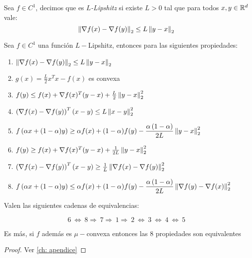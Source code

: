 \begin{definition}
	\label{def: L Lipshitz}
	Sea $f \in C^1$, decimos que es $L$\textit{-Lipshitz} si existe $L > 0$ tal que para todos $x,y \in {\mathbb{R}}^d$ vale:
	\begin{equation}
	\left\lVert\nabla f(x) - \nabla f (y)\right\rVert_2 \leq  L\left\lVert y-x\right\rVert_2
	\end{equation}
\end{definition}

\begin{proposition}
	\label{prop: Implicancias L lipshitz}
	Sea $f \in C^1$ una funci\'on $L-$Lipshitz, entonces para las siguientes propiedades:
	\begin{enumerate}
		\item $\left\lVert\nabla f(x) - \nabla f (y)\right\rVert_2 \leq  L\left\lVert y-x\right\rVert_2$
		\item $g(x) = \frac{L}{2} x^Tx - f(x)$ es convexa
		\item $f(y) \leq f(x) + \nabla f(x)^T (y-x) + \frac{L}{2}\left\lVert y-x\right\rVert_2^2$
		\item $\left(\nabla f(x) - \nabla f(y)\right)^T (x-y) \leq L\left\lVert x-y\right\rVert^2_2$
		\item $f\left(\alpha x + (1-\alpha)y\right) \geq \alpha f(x) + (1-\alpha) f(y) - \dfrac{\alpha \left(1 - \alpha \right)}{2L}\left\lVert y-x\right\rVert_2^2$
		\item $f(y) \geq f(x) + \nabla f(x)^T (y-x) +\frac{1}{2L} \left\lVert y-x\right\rVert^2_2$
		\item $\left(\nabla f(x) - \nabla f(y)\right)^T (x-y) \geq \frac{1}{L}\left\lVert\nabla f(x)- \nabla f(y)\right\rVert^2_2$
		\item $f\left(\alpha x + (1-\alpha)y\right) \leq \alpha f(x) + (1-\alpha) f(y) - \dfrac{\alpha \left(1 - \alpha \right)}{2L}\left\lVert\nabla f(y)- \nabla f (x)\right\rVert_2^2$
	\end{enumerate}

	Valen las siguientes cadenas de equivalencias:
	
	\begin{equation*}
		6 \ \Longleftrightarrow \ 8 \Longrightarrow \ 7 \Longrightarrow \ 1 \Longrightarrow \ 2 \ \Longleftrightarrow \ 3 \ \Longleftrightarrow \ 4 \ \Longleftrightarrow \ 5
	\end{equation*}
	
	Es m\'as, si $f$ adem\'as es $\mu-$convexa entonces las 8 propiedades son equivalentes
\end{proposition}

\begin{proof}
	Ver \ref{ch: apendice}
\end{proof}

